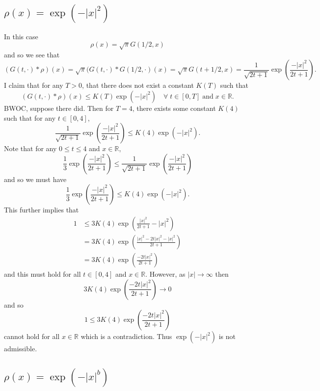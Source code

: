 \documentclass{article}
\numberwithin{equation}{section}
\newcommand{\R}{\mathbb{R}}
\begin{document}
\subsection{$\rho(x) = \exp(-|x|^2)$}

In this case
\[
\rho(x) = \sqrt{\pi} G( 1/2 , x )
\]
and so we see that
\begin{equation}\label{E:exp(x^2)}
(G(t,\cdot) * \rho)(x)  = \sqrt{\pi} (G(t,\cdot) * G(1/2, \cdot)(x) = \sqrt{\pi} G(t+1/2,x) = \frac{1}{\sqrt{2t+1}} \exp\left(\frac{-|x|^2}{2t+1}\right).
\end{equation}
I claim that for any $T>0$, that there does not exist a constant $K(T)$ such that
\[
(G(t,\cdot) * \rho)(x) \le K(T) \exp(-|x|^2) \quad \forall \; t\in[0,T] \; \text{and} \; x\in \R.
\]
BWOC, suppose there did. Then for $T=4$, there exists some constant $K(4) $ such that for any $t\in[0,4]$,
\[
\frac{1}{\sqrt{2t+1}} \exp\left(\frac{-|x|^2}{2t+1}\right) \le K(4) \exp(-|x|^2).
\]
Note that for any  $0\le t \le 4$ and $x\in \R$,
\[
\frac{1}{3} \exp\left(\frac{-|x|^2}{2t+1}\right)  \le \frac{1}{\sqrt{2t+1}} \exp\left(\frac{-|x|^2}{2t+1}\right)
\]
and so we must have
\[
\frac{1}{3} \exp\left(\frac{-|x|^2}{2t+1}\right) \le K(4)\exp(-|x|^2).
\]
This further implies that
\begin{align*}
1 &\le 3 K(4) \exp\left( \frac{|x|^2}{2t+1} - |x|^2 \right)
\\&= 3 K(4) \exp\left( \frac{|x|^2 -2t|x|^2 -|x|^2}{2t+1} \right)
\\& = 3 K(4) \exp\left( \frac{-2t|x|^2 }{2t+1} \right)
\end{align*}
and this must hold for all $t \in [0,4]$ and $x \in \R$. However, as $|x| \to \infty$ then
\[
3 K(4) \exp\left( \frac{-2t|x|^2 }{2t+1} \right) \to 0
\]
and so
\begin{equation} \label{E:contradiction}
1 \le 3 K(4) \exp\left( \frac{-2t|x|^2 }{2t+1} \right)
\end{equation}
cannot hold for all $x \in \R$ which is a contradiction. Thus $\exp(-|x|^2)$ is not admissible.

\subsection{$\rho(x) = \exp(-|x|^b)$}
\end{document}
